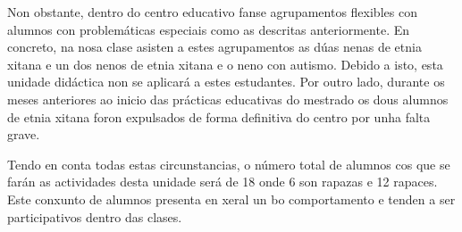 Non obstante, dentro do centro educativo fanse agrupamentos flexibles con alumnos con problemáticas especiais como as descritas anteriormente. En concreto, na nosa clase asisten a estes agrupamentos as dúas nenas de etnia xitana e un dos nenos de etnia xitana e o neno con autismo. Debido a isto, esta unidade didáctica non se aplicará a estes estudantes. Por outro lado, durante os meses anteriores ao inicio das prácticas educativas do mestrado os dous alumnos de etnia xitana foron expulsados de forma definitiva do centro por unha falta grave.

Tendo en conta todas estas circunstancias, o número total de alumnos cos que se farán as actividades desta unidade será de 18 onde 6 son rapazas e 12 rapaces. Este conxunto de alumnos presenta en xeral un bo comportamento e tenden a ser participativos dentro das clases.
